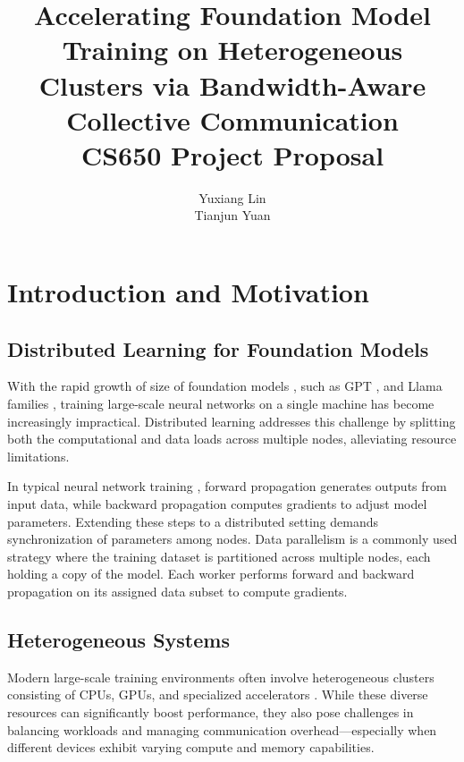 \documentclass{article}
\title{
    \Large Accelerating Foundation Model Training on Heterogeneous Clusters
    via Bandwidth-Aware Collective Communication \\[1em]
    \normalsize CS650 Project Proposal
}
\author{%
  Yuxiang Lin \\
  \And
  Tianjun Yuan \\
}
\begin{document}
\maketitle



\section{Introduction and Motivation}

\subsection{Distributed Learning for Foundation Models}

With the rapid growth of size of foundation models \cite{kaplan2020scalinglawsneurallanguage}, such as GPT \cite{floridi2020gpt, achiam2023gpt}, and Llama families \cite{touvron2023llama}, training large-scale neural networks on a single machine has become increasingly impractical. Distributed learning \cite{chen2021distributed} addresses this challenge by splitting both the computational and data loads across multiple nodes, alleviating resource limitations. 

In typical neural network training \cite{lecun2015deep}, forward propagation generates outputs from input data, while backward propagation computes gradients to adjust model parameters. Extending these steps to a distributed setting demands synchronization of parameters among nodes.  Data parallelism \cite{neglia2019role} is a commonly used strategy where the training dataset is partitioned across multiple nodes, each holding a copy of the model. Each worker performs forward and backward propagation on its assigned data subset to compute gradients.

\subsection{Heterogeneous Systems}

Modern large-scale training environments often involve heterogeneous clusters consisting of CPUs, GPUs, and specialized accelerators \cite{duan2024efficient}. While these diverse resources can significantly boost performance, they also pose challenges in balancing workloads and managing communication overhead—especially when different devices exhibit varying compute and memory capabilities.
\end{document}
